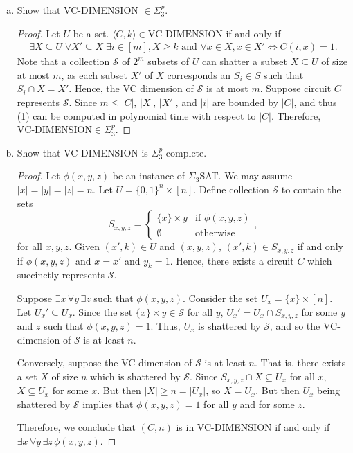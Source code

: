 \documentclass[a4paper]{article}
\begin{document}
\begin{enumerate}[(a)]
  \item Show that VC-DIMENSION $\in \Sigma_3^p$.
  \begin{proof}
    Let $U$ be a set. $\langle C, k \rangle \in \text{VC-DIMENSION}$ if and only if
    \begin{gather}
      \exists X \subseteq U \; \forall X' \subseteq X \; \exists i \in [m], X \geq k \text{ and } \forall x \in X, x \in X' \Leftrightarrow C(i, x) = 1.
    \end{gather}
    Note that a collection $\mathcal{S}$ of $2^m$ subsets of $U$ can shatter a subset $X \subseteq
    U$ of size at most $m$, as each subset $X'$ of $X$ corresponds an $S_i \in S$ such that $S_i
    \cap X = X'$. Hence, the VC dimension of $\mathcal{S}$ is at most $m$. Suppose circuit $C$
    represents $\mathcal{S}$. Since $m \leq |C|$, $|X|$, $|X'|$, and $|i|$ are bounded by $|C|$, and
    thus (1) can be computed in polynomial time with respect to $|C|$. Therefore,
    $\text{VC-DIMENSION} \in \Sigma_3^p$.
  \end{proof}
  \item Show that VC-DIMENSION is $\Sigma_3^p$-complete.
  \begin{proof}
    Let $\phi(x, y, z)$ be an instance of $\Sigma_3$SAT. We may assume $|x| = |y| = |z| = n$. Let $U
    = \{0, 1\}^n \times [n]$. Define collection $\mathcal{S}$ to contain the sets
    \[
      S_{x, y, z} = \begin{cases}
        \{x\} \times y & \text{if } \phi(x, y, z) \\
        \emptyset & \text{otherwise}
      \end{cases},
    \]
    for all $x, y, z$. Given $(x', k) \in U$ and $(x, y, z)$, $(x', k) \in S_{x, y, z}$ if and only
    if $\phi(x, y, z)$ and $x = x'$ and $y_k = 1$. Hence, there exists a circuit $C$ which
    succinctly represents $\mathcal{S}$. 

    Suppose $\exists x \, \forall y \, \exists z$ such that $\phi(x, y, z)$. Consider the set $U_x =
    \{x\} \times [n]$. Let $U_x' \subseteq U_x$. Since the set $\{x\} \times y \in \mathcal{S}$ for
    all $y$, $U_x' = U_x \cap S_{x, y, z}$ for some $y$ and $z$ such that $\phi(x, y, z) = 1$. Thus,
    $U_x$ is shattered by $\mathcal{S}$, and so the VC-dimension of $\mathcal{S}$ is at least $n$.

    Conversely, suppose the VC-dimension of $\mathcal{S}$ is at least $n$. That is, there exists a
    set $X$ of size $n$ which is shattered by $\mathcal{S}$. Since $S_{x, y, z} \cap X \subseteq
    U_x$ for all $x$, $X \subseteq U_x$ for some $x$. But then $|X| \geq n = |U_x|$, so $X = U_x$.
    But then $U_x$ being shattered by $\mathcal{S}$ implies that $\phi(x, y, z) = 1$ for all $y$ and
    for some $z$. 

    Therefore, we conclude that $(C, n)$ is in VC-DIMENSION if and only if $\exists x \, \forall y
    \, \exists z \, \phi(x, y, z)$. 
  \end{proof}
\end{enumerate}
\end{document}
